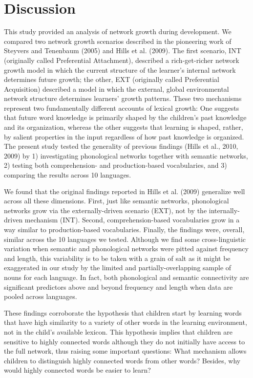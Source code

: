 \documentclass[english,floatsintext,man]{apa6}
\theoremstyle{definition}
\theoremstyle{definition}
\theoremstyle{definition}
\theoremstyle{remark}
\begin{document}
\section{Discussion}\label{discussion}

This study provided an analysis of network growth during development. We
compared two network growth scenarios described in the pioneering work
of Steyvers and Tenenbaum (2005) and Hills et al. (2009). The first
scenario, INT (originally called Preferential Attachment), described a
rich-get-richer network growth model in which the current structure of
the learner's internal network determines future growth; the other, EXT
(originally called Preferential Acquisition) described a model in which
the external, global environmental network structure determines
learners' growth patterns. These two mechanisms represent two
fundamentally different accounts of lexical growth: One suggests that
future word knowledge is primarily shaped by the children's past
knowledge and its organization, whereas the other suggests that learning
is shaped, rather, by salient properties in the input regardless of how
past knowledge is organized. The present study tested the generality of
previous findings (Hills et al., 2010, 2009) by 1) investigating
phonological networks together with semantic networks, 2) testing both
comprehension- and production-based vocabularies, and 3) comparing the
results across 10 languages.

We found that the original findings reported in Hills et al. (2009)
generalize well across all these dimensions. First, just like semantic
networks, phonological networks grow via the externally-driven scenario
(EXT), not by the internally-driven mechanism (INT). Second,
comprehension-based vocabularies grow in a way similar to
production-based vocabularies. Finally, the findings were, overall,
similar across the 10 languages we tested. Although we find some
cross-linguistic variation when semantic and phonological networks were
pitted against frequency and length, this variability is to be taken
with a grain of salt as it might be exaggerated in our study by the
limited and partially-overlapping sample of nouns for each language. In
fact, both phonological and semantic connectivity are significant
predictors above and beyond frequency and length when data are pooled
across languages.

These findings corroborate the hypothesis that children start by
learning words that have high similarity to a variety of other words in
the learning environment, not in the child's available lexicon. This
hypothesis implies that children are sensitive to highly connected words
although they do not initially have access to the full network, thus
raising some important questions: What mechanism allows children to
distinguish highly connected words from other words? Besides, why would
highly connected words be easier to learn?
\end{document}
